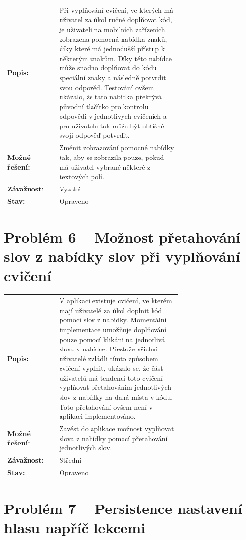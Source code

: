 \begin{tabular}{lp{0.7\linewidth}}
    \textbf{Popis:} & Při vyplňování cvičení, ve kterých má uživatel za úkol ručně doplňovat kód, je uživateli na mobilních zařízeních zobrazena pomocná nabídka znaků, díky které má jednodušší přístup k některým znakům. Díky této nabídce může snadno doplňovat do kódu speciální znaky a následně potvrdit svou odpověď. Testování ovšem ukázalo, že tato nabídka překrývá původní tlačítko pro kontrolu odpovědi v jednotlivých cvičeních a pro uživatele tak může být obtížné svoji odpověď potvrdit. \\
    \textbf{Možné řešení:} & Změnit zobrazování pomocné nabídky tak, aby se zobrazila pouze, pokud má uživatel vybrané některé z textových polí. \\
    \textbf{Závažnost:} & Vysoká \\
    \textbf{Stav:} & Opraveno  \\
\end{tabular}

\section*{Problém 6 – Možnost přetahování slov z nabídky slov při vyplňování cvičení}

\begin{tabular}{lp{0.7\linewidth}}
    \textbf{Popis:} & V aplikaci existuje cvičení, ve kterém mají uživatelé za úkol doplnit kód pomocí slov z nabídky. Momentální implementace umožňuje doplňování pouze pomocí klikání na jednotlivá slova v nabídce. Přestože všichni uživatelé zvládli tímto způsobem cvičení vyplnit, ukázalo se, že část uživatelů má tendenci toto cvičení vyplňovat přetahováním jednotlivých slov z nabídky na daná místa v kódu. Toto přetahování ovšem není v aplikaci implementováno. \\
    \textbf{Možné řešení:} & Zavést do aplikace možnost vyplňovat slova z nabídky pomocí přetahování jednotlivých slov. \\
    \textbf{Závažnost:} & Střední \\
    \textbf{Stav:} & Opraveno  \\
\end{tabular}

\section*{Problém 7 – Persistence nastavení hlasu napříč lekcemi}

